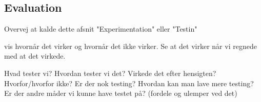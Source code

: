 
\subsection{Evaluation}

Overvej at kalde dette afsnit "Experimentation" eller "Testin"

vis hvornår det virker og hvornår det ikke virker. 
Se at det virker når vi regnede med at det virkede.

Hvad tester vi?
Hvordan tester vi det?
Virkede det efter hensigten?
Hvorfor/hvorfor ikke?
Er der nok testing?
Hvordan kan man lave mere testing?
Er der andre måder vi kunne have testet på? (fordele og ulemper ved det)
